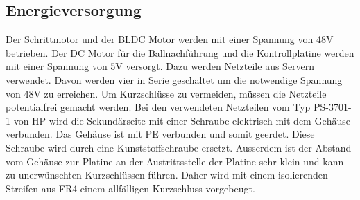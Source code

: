 \subsection{Energieversorgung}
Der Schrittmotor und der BLDC Motor werden mit einer Spannung von 48\si{\volt} 
betrieben. Der DC Motor für die Ballnachführung und die Kontrollplatine werden 
mit einer Spannung von 5\si{\volt} versorgt. Dazu werden Netzteile aus Servern 
verwendet. Davon werden vier in Serie geschaltet um die notwendige Spannung 
von 48\si{\volt} zu erreichen. Um Kurzschlüsse zu vermeiden, müssen die 
Netzteile potentialfrei gemacht werden. Bei den verwendeten Netzteilen vom Typ 
PS-3701-1 von HP wird die Sekundärseite mit einer Schraube elektrisch mit dem 
Gehäuse verbunden. Das Gehäuse ist mit PE verbunden und somit geerdet. Diese 
Schraube wird durch eine Kunststoffschraube ersetzt. Ausserdem ist der Abstand 
vom Gehäuse zur Platine an der Austrittsstelle der Platine sehr klein und kann 
zu unerwünschten Kurzschlüssen führen. Daher wird mit einem isolierenden 
Streifen aus FR4 einem allfälligen Kurzschluss vorgebeugt. 
